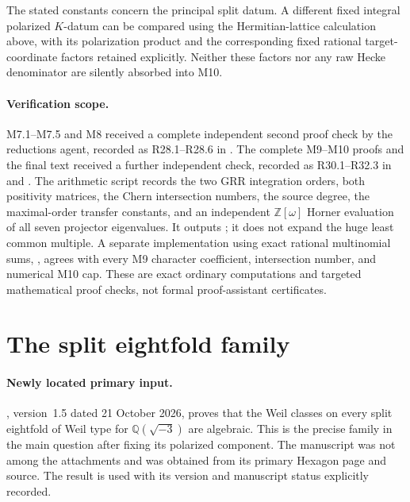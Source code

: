 \documentclass[11pt,a4paper]{article}
\theoremstyle{definition}\newtheorem{definition}[theorem]{Definition}
\theoremstyle{remark}\newtheorem{remark}[theorem]{Remark}
\newcommand{\Q}{\mathbb Q}\newcommand{\Z}{\mathbb Z}\newcommand{\C}{\mathbb C}\newcommand{\R}{\mathbb R}
\begin{document}
The stated constants concern the principal split datum. A different
fixed integral polarized $K$-datum can be compared using the
Hermitian-lattice calculation above, with its polarization product
and the corresponding fixed rational target-coordinate factors
retained explicitly. Neither these factors nor any raw Hecke
denominator are silently absorbed into M10.

\paragraph{Verification scope.}
M7.1--M7.5 and M8 received a complete independent second proof check
by the reductions agent, recorded as R28.1--R28.6 in
.
The complete M9--M10 proofs and the final text received a further
independent check, recorded as R30.1--R32.3 in
 and
.
The arithmetic script
 records the two GRR
integration orders, both positivity matrices, the Chern intersection
numbers, the source degree, the maximal-order transfer constants,
and an independent $\Z[\omega]$ Horner evaluation of all seven
projector eigenvalues. It outputs
; it does not expand the
huge least common multiple. A separate implementation using exact
rational multinomial sums,
, agrees with
every M9 character coefficient, intersection number, and numerical
M10 cap. These are exact ordinary computations
and targeted mathematical proof checks, not formal
proof-assistant certificates.



\section{The split eightfold family}\label{sec:eightfold}
\paragraph{Newly located primary input.}
\citet[Theorem~A]{Severn26}, version~1.5 dated 21 October 2026, proves that the Weil classes on every split eightfold of Weil type for $\Q(\sqrt{-3})$ are algebraic. This is the precise family in the main question after fixing its polarized component. The manuscript was not among the attachments and was obtained from its primary Hexagon page and source. The result is used with its version and manuscript status explicitly recorded.
\end{document}
